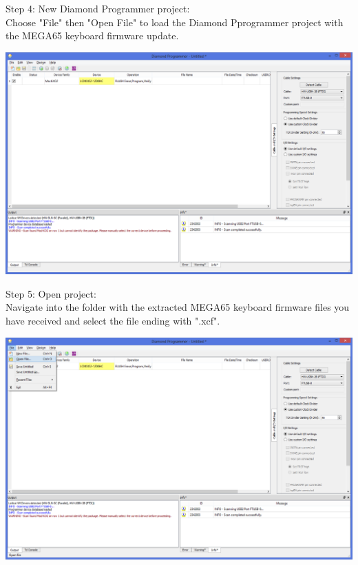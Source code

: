 \begin{minipage}{\linewidth}
Step 4: New Diamond Programmer project: \\
Choose "File" then "Open File" to load the Diamond Pprogrammer
project with the MEGA65 keyboard firmware update.
  \begin{center}
  \includegraphics[width=0.8\linewidth]{images/diamond04.png}
  \end{center}
\end{minipage}


\begin{minipage}{\linewidth}
Step 5: Open project: \\
Navigate into the folder with the extracted MEGA65 keyboard
firmware files you have received and select the file ending with ".xcf".
  \begin{center}
  \includegraphics[width=0.8\linewidth]{images/diamond05.png}
  \end{center}
\end{minipage}

\vspace{5mm}

